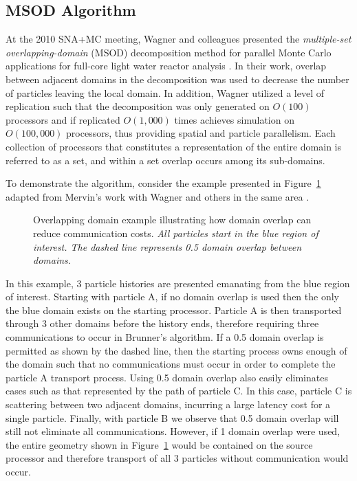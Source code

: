 \documentclass{snamc2013}
\begin{document}
\subsection{MSOD Algorithm}
At the 2010 SNA+MC meeting, Wagner and colleagues presented the
\textit{multiple-set overlapping-domain} (MSOD) decomposition method
for parallel Monte Carlo applications for full-core light water
reactor analysis \cite{wagner_hybrid_2010}. In their work, overlap
between adjacent domains in the decomposition was used to decrease the
number of particles leaving the local domain. In addition, Wagner
utilized a level of replication such that the decomposition was only
generated on $O(100)$ processors and if replicated $O(1,000)$ times
achieves simulation on $O(100,000)$ processors, thus providing spatial
and particle parallelism. Each collection of processors that
constitutes a representation of the entire domain is referred to as a
set, and within a set overlap occurs among its sub-domains.

To demonstrate the algorithm, consider the example presented in
Figure~\ref{fig:msod_example} adapted from Mervin's work with Wagner
and others in the same area \cite{mervin_variance_2012}.
\begin{figure}[H]
  \begin{center}
    \scalebox{0.8}{  }
  \end{center}
  \caption{Overlapping domain example illustrating how domain overlap
    can reduce communication costs. \textit{All particles start in the
      blue region of interest. The dashed line represents 0.5 domain
      overlap between domains.}}
  \label{fig:msod_example}
\end{figure}
In this example, 3 particle histories are presented emanating from the
blue region of interest. Starting with particle A, if no domain
overlap is used then the only the blue domain exists on the starting
processor. Particle A is then transported through 3 other domains
before the history ends, therefore requiring three communications to
occur in Brunner's algorithm. If a 0.5 domain overlap is permitted as
shown by the dashed line, then the starting process owns enough of the
domain such that no communications must occur in order to complete the
particle A transport process. Using 0.5 domain overlap also easily
eliminates cases such as that represented by the path of particle
C. In this case, particle C is scattering between two adjacent
domains, incurring a large latency cost for a single
particle. Finally, with particle B we observe that 0.5 domain overlap
will still not eliminate all communications. However, if 1 domain
overlap were used, the entire geometry shown in
Figure~\ref{fig:msod_example} would be contained on the source
processor and therefore transport of all 3 particles without
communication would occur.
\end{document}
